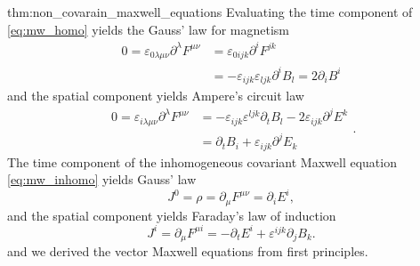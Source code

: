 \begin{delayedproof}{thm:non_covarain_maxwell_equations}
	Evaluating the time component of \cref{eq:mw_homo} yields the Gauss' law for magnetism
	\begin{equation}
		\begin{split}
			0
			=
			\varepsilon_{0\lambda\mu\nu}\partial^\lambda F^{\mu\nu}
			&=
			\varepsilon_{0ijk}\partial^iF^{jk}
			\\
			&=
			-
			\varepsilon_{ijk}\varepsilon_{ljk}
			\partial^i B_l
			=
			2\partial_iB^i
		\end{split}
		\label{eq:mw_gauss_law_mag}
	\end{equation}
	and the spatial component yields Ampere's circuit law
	\begin{equation}
		\begin{split}
			0
			=
			\varepsilon_{i\lambda\mu\nu}
			\partial^\lambda
			F^{\mu\nu}
			&=
			-
			\varepsilon_{ijk}
			\varepsilon^{ljk}
			\partial_t B_l
			-
			2\varepsilon_{ijk}
			\partial^jE^k
			\\
			&=
			\partial_tB_i
			+
			\varepsilon_{ijk}
			\partial^jE_k
		\end{split}
		\label{eq:mw_ampere_law}.
	\end{equation}
	The time component of the inhomogeneous covariant Maxwell equation \cref{eq:mw_inhomo} yields Gauss' law
	\begin{equation}
		J^0
		=
		\rho
		=
		\partial_\mu F^{\mu\nu}
		=
		\partial_i E^i
		\label{eq:mw_gauss_law},
	\end{equation}
	and the spatial component yields Faraday's law of induction
	\begin{equation}
		J^i
		=
		\partial_\mu F^{\mu i}
		=
		-\partial_t E^i
		+\varepsilon^{ijk}\partial_j B_k
		\label{eq:mw_faraday_law}.
	\end{equation}
	and we derived the vector Maxwell equations from first principles.	
\end{delayedproof}